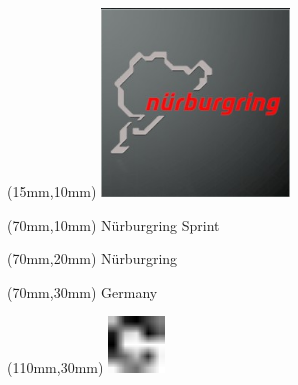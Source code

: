 \null\newpage
\begin{textblock*}{50mm}(15mm,10mm)%
\includegraphics[width=50mm]{LG/2015-05-20_00089.png}
\end{textblock*}
\begin{textblock*}{130mm}(70mm,10mm)%
{\fontsize{20}{20}\selectfont Nürburgring Sprint}\\
\end{textblock*}
\begin{textblock*}{120mm}(70mm,20mm)%
{\fontsize{16}{16}\selectfont Nürburgring}\\
\end{textblock*}
\begin{textblock*}{120mm}(70mm,30mm)%
{\fontsize{12}{12}\selectfont Germany}
\end{textblock*}
\begin{textblock*}{30mm}(110mm,30mm)%
\centering
\includegraphics[height=15mm]{icons/fa-rotate-right.pdf}
\end{textblock*}
